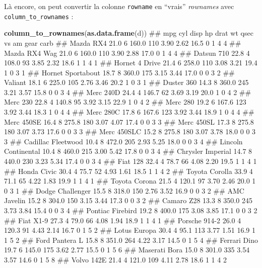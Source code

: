 \documentclass[]{book}
\newenvironment{Shaded}{\begin{snugshade}}{\end{snugshade}}
\newcommand{\KeywordTok}[1]{\textcolor[rgb]{0.13,0.29,0.53}{\textbf{#1}}}
\newcommand{\NormalTok}[1]{#1}
\theoremstyle{definition}
\theoremstyle{definition}
\theoremstyle{definition}
\theoremstyle{remark}
\begin{document}
Là encore, on peut convertir la colonne \texttt{rowname} en ``vrais''
\emph{rownames} avec \texttt{column\_to\_rownames} :

\begin{Shaded}
\begin{Highlighting}[]
\KeywordTok{column_to_rownames}\NormalTok{(}\KeywordTok{as.data.frame}\NormalTok{(d))}
\NormalTok{##                      mpg cyl  disp  hp drat   wt qsec vs am gear carb}
\NormalTok{## Mazda RX4           21.0   6 160.0 110 3.90 2.62 16.5  0  1    4    4}
\NormalTok{## Mazda RX4 Wag       21.0   6 160.0 110 3.90 2.88 17.0  0  1    4    4}
\NormalTok{## Datsun 710          22.8   4 108.0  93 3.85 2.32 18.6  1  1    4    1}
\NormalTok{## Hornet 4 Drive      21.4   6 258.0 110 3.08 3.21 19.4  1  0    3    1}
\NormalTok{## Hornet Sportabout   18.7   8 360.0 175 3.15 3.44 17.0  0  0    3    2}
\NormalTok{## Valiant             18.1   6 225.0 105 2.76 3.46 20.2  1  0    3    1}
\NormalTok{## Duster 360          14.3   8 360.0 245 3.21 3.57 15.8  0  0    3    4}
\NormalTok{## Merc 240D           24.4   4 146.7  62 3.69 3.19 20.0  1  0    4    2}
\NormalTok{## Merc 230            22.8   4 140.8  95 3.92 3.15 22.9  1  0    4    2}
\NormalTok{## Merc 280            19.2   6 167.6 123 3.92 3.44 18.3  1  0    4    4}
\NormalTok{## Merc 280C           17.8   6 167.6 123 3.92 3.44 18.9  1  0    4    4}
\NormalTok{## Merc 450SE          16.4   8 275.8 180 3.07 4.07 17.4  0  0    3    3}
\NormalTok{## Merc 450SL          17.3   8 275.8 180 3.07 3.73 17.6  0  0    3    3}
\NormalTok{## Merc 450SLC         15.2   8 275.8 180 3.07 3.78 18.0  0  0    3    3}
\NormalTok{## Cadillac Fleetwood  10.4   8 472.0 205 2.93 5.25 18.0  0  0    3    4}
\NormalTok{## Lincoln Continental 10.4   8 460.0 215 3.00 5.42 17.8  0  0    3    4}
\NormalTok{## Chrysler Imperial   14.7   8 440.0 230 3.23 5.34 17.4  0  0    3    4}
\NormalTok{## Fiat 128            32.4   4  78.7  66 4.08 2.20 19.5  1  1    4    1}
\NormalTok{## Honda Civic         30.4   4  75.7  52 4.93 1.61 18.5  1  1    4    2}
\NormalTok{## Toyota Corolla      33.9   4  71.1  65 4.22 1.83 19.9  1  1    4    1}
\NormalTok{## Toyota Corona       21.5   4 120.1  97 3.70 2.46 20.0  1  0    3    1}
\NormalTok{## Dodge Challenger    15.5   8 318.0 150 2.76 3.52 16.9  0  0    3    2}
\NormalTok{## AMC Javelin         15.2   8 304.0 150 3.15 3.44 17.3  0  0    3    2}
\NormalTok{## Camaro Z28          13.3   8 350.0 245 3.73 3.84 15.4  0  0    3    4}
\NormalTok{## Pontiac Firebird    19.2   8 400.0 175 3.08 3.85 17.1  0  0    3    2}
\NormalTok{## Fiat X1-9           27.3   4  79.0  66 4.08 1.94 18.9  1  1    4    1}
\NormalTok{## Porsche 914-2       26.0   4 120.3  91 4.43 2.14 16.7  0  1    5    2}
\NormalTok{## Lotus Europa        30.4   4  95.1 113 3.77 1.51 16.9  1  1    5    2}
\NormalTok{## Ford Pantera L      15.8   8 351.0 264 4.22 3.17 14.5  0  1    5    4}
\NormalTok{## Ferrari Dino        19.7   6 145.0 175 3.62 2.77 15.5  0  1    5    6}
\NormalTok{## Maserati Bora       15.0   8 301.0 335 3.54 3.57 14.6  0  1    5    8}
\NormalTok{## Volvo 142E          21.4   4 121.0 109 4.11 2.78 18.6  1  1    4    2}
\end{Highlighting}
\end{Shaded}
\end{document}
